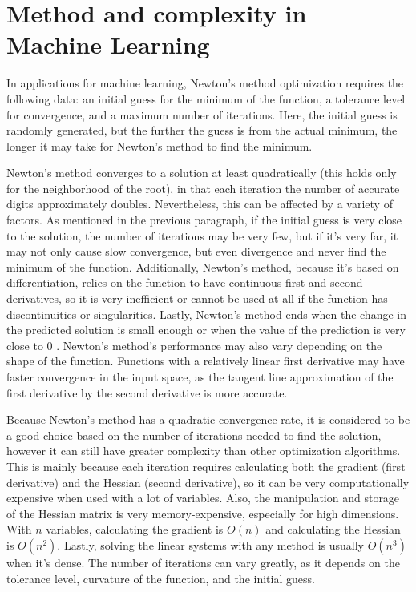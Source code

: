 \documentclass{article}
\begin{document}
\section*{Method and complexity in Machine Learning}
In applications for machine learning, Newton's method optimization requires the following data: an initial guess for the minimum of the function, a tolerance level for convergence, and a maximum number of iterations. Here, the initial guess is randomly generated, but the further the guess is from the actual minimum, the longer it may take for Newton's method to find the minimum.

Newton's method converges to a solution at least quadratically (this holds only for the neighborhood of the root), in that each iteration the number of accurate digits approximately doubles. Nevertheless, this can be affected by a variety of factors. As mentioned in the previous paragraph, if the initial guess is very close to the solution, the number of iterations may be very few, but if it's very far, it may not only cause slow convergence, but even divergence and never find the minimum of the function. Additionally, Newton's method, because it's based on differentiation, relies on the function to have continuous first and second derivatives, so it is very inefficient or cannot be used at all if the function has discontinuities or singularities. Lastly, Newton's method ends when the change in the predicted solution is small enough or when the value of the prediction is very close to 0 . Newton's method's performance may also vary depending on the shape of the function. Functions with a relatively linear first derivative may have faster convergence in the input space, as the tangent line approximation of the first derivative by the second derivative is more accurate.

Because Newton's method has a quadratic convergence rate, it is considered to be a good choice based on the number of iterations needed to find the solution, however it can still have greater complexity than other optimization algorithms. This is mainly because each iteration requires calculating both the gradient (first derivative) and the Hessian (second derivative), so it can be very computationally expensive when used with a lot of variables. Also, the manipulation and storage of the Hessian matrix is very memory-expensive, especially for high dimensions. With $n$ variables, calculating the gradient is $O(n)$ and calculating the Hessian is $O\left(n^{2}\right)$. Lastly, solving the linear systems with any method is usually $O\left(n^{3}\right)$ when it's dense. The number of iterations can vary greatly, as it depends on the tolerance level, curvature of the function, and the initial guess.
\end{document}
